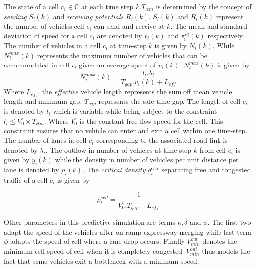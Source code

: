 \documentclass{wscpaperproc}
\theoremstyle{wsc}
\begin{document}
The state of a cell $c_i\in \mathbb{C}$ at each time step $k.T_{ctm}$ is determined by the concept of {\it sending} $S_i(k)$ and {\it receiving potentials} $R_i(k)$. $S_i(k)$ and $R_i(k)$ represent the number of vehicles cell $c_i$ can send and receive at $k$. The mean and standard deviation of speed for a cell $c_i$ are denoted by $v_i(k)$ and $v_i^{sd}(k)$ respectively.  The number of vehicles in a cell $c_i$ at time-step $k$ is given by $N_{i}(k)$. While $N_i^{max}(k)$ represents the maximum number of vehicles that can be accommodated in cell $c_i$ given an average speed of $v_i(k)$. $N_i^{max}(k)$ is given by
\begin{equation}
\label{eq:nmax}
N_i^{max}(k)=\frac{l_i.\lambda_i}{T_{gap}.v_{i}(k)+ L_{eff}}
\end{equation}
Where $L_{eff}$, the {\it effective} vehicle length represents the sum off mean vehicle length and minimum gap. $T_{gap}$ represents the safe time gap.
The length of cell $c_i$ is denoted by $l_i$ which is variable while being subject to the constraint $l_i \le V_0^i\times T_{ctm}$. Where $V_0^i$ is the constant free-flow speed for the cell. This constraint ensures that no vehicle can enter and exit a cell within one time-step. The number of lanes in cell $c_i$ corresponding to the associated road-link is denoted by $\lambda_i$. The outflow in number of vehicles at time-step $k$ from cell $c_i$ is given by $y_i(k)$ while the density in number of vehicles per unit distance per lane is denoted by $\rho_i(k)$. The {\it critical density} $\rho^{crit}_i$ separating free and congested traffic of a cell $c_i$ is given by 

\begin{equation}
\label{eq:critden}
\rho^{crit}_i=\frac{1}{V_0^i.T_{gap}+L_{eff}}
\end{equation}

Other parameters in this predictive simulation are terms $\kappa, \delta$ and $\phi$. The first two adapt the speed of the vehicles after on-ramp expressway merging while last term $\phi$ adapts the speed of cell where a lane drop occurs. Finally $V^{out}_{min}$ denotes the minimum cell speed of cell when it is completely congested. $V^{out}_{min}$ thus models the fact that some vehicles exit a bottleneck with a minimum speed. 
\end{document}

